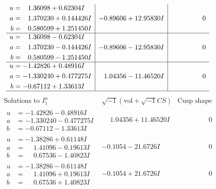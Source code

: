 \documentclass[1p]{elsarticle_modified}
\theoremstyle{definition}
\newcommand{\I}{\sqrt{-1}}
\begin{document}
$$\begin{array}{c|c|c}
\begin{aligned}
u &= \phantom{-}1.36098 + 0.62304 I \\
a &= \phantom{-}1.370230 + 0.144426 I \\
b &= \phantom{-}0.580599 + 1.251450 I\end{aligned}
 & -0.89606 + 12.95830 I & \phantom{-0.000000 } 0 \\ \hline\begin{aligned}
u &= \phantom{-}1.36098 - 0.62304 I \\
a &= \phantom{-}1.370230 - 0.144426 I \\
b &= \phantom{-}0.580599 - 1.251450 I\end{aligned}
 & -0.89606 - 12.95830 I & \phantom{-0.000000 } 0 \\ \hline\begin{aligned}
u &= -1.42826 + 0.48916 I \\
a &= -1.330240 + 0.477275 I \\
b &= -0.67112 + 1.33613 I\end{aligned}
 & \phantom{-}1.04356 - 11.46520 I & \phantom{-0.000000 } 0\\
 \hline 
 \end{array}$$\newpage$$\begin{array}{c|c|c}  
\text{Solutions to }I^u_{1}& \I (\text{vol} + \sqrt{-1}CS) & \text{Cusp shape}\\
 \hline 
\begin{aligned}
u &= -1.42826 - 0.48916 I \\
a &= -1.330240 - 0.477275 I \\
b &= -0.67112 - 1.33613 I\end{aligned}
 & \phantom{-}1.04356 + 11.46520 I & \phantom{-0.000000 } 0 \\ \hline\begin{aligned}
u &= -1.38286 + 0.61148 I \\
a &= \phantom{-}1.41096 - 0.19613 I \\
b &= \phantom{-}0.67536 - 1.40823 I\end{aligned}
 & -0.1054 - 21.6726 I & \phantom{-0.000000 } 0 \\ \hline\begin{aligned}
u &= -1.38286 - 0.61148 I \\
a &= \phantom{-}1.41096 + 0.19613 I \\
b &= \phantom{-}0.67536 + 1.40823 I\end{aligned}
 & -0.1054 + 21.6726 I & \phantom{-0.000000 } 0 \\ \hline\begin{aligned}

\end{aligned}
\end{array}$$
\end{document}
